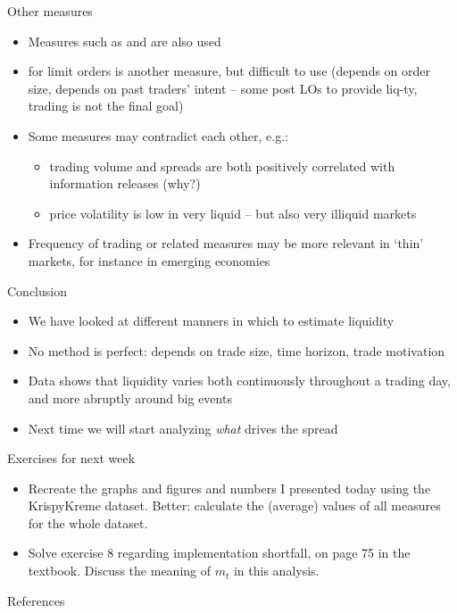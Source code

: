 \documentclass[english,10pt
,aspectratio=169
]{beamer}
\begin{document}
\begin{frame}{Other measures}
\begin{itemize}
	\item Measures such as  and  are also used
	\item {} for limit orders is another measure, but difficult to use (depends on order size, depends on past traders' intent -- some post LOs to provide liq-ty, trading is not the final goal)
	\\[4ex]
	\item Some measures may contradict each other, e.g.:
	\begin{itemize}
		\item trading volume and spreads are both positively correlated with information releases (why?)
		\item price volatility is low in very liquid -- but also very illiquid markets
	\end{itemize}
	\item Frequency of trading or related measures may be more relevant in `thin' markets, for instance in emerging economies
\end{itemize}
\end{frame}


\begin{frame}{Conclusion}
	\begin{itemize}
		\item We have looked at different manners in which to estimate liquidity
		\item No method is perfect: depends on trade size, time horizon, trade motivation
		\item Data shows that liquidity varies both continuously throughout a trading day, and more abruptly around big events
		\item Next time we will start analyzing \textit{what} drives the spread
	\end{itemize}
\end{frame}


\begin{frame}{Exercises for next week}
	\begin{itemize}
		\item Recreate the graphs and figures and numbers I presented today using the KrispyKreme dataset. Better: calculate the (average) values of all measures for the whole dataset.
		\item Solve exercise 8 regarding implementation shortfall, on page 75 in the textbook.
		Discuss the meaning of $m_t$ in this analysis.
	\end{itemize}
\end{frame}




\appendix
\begin{frame}[allowframebreaks]{References}
	
	
\end{frame}
\end{document}
